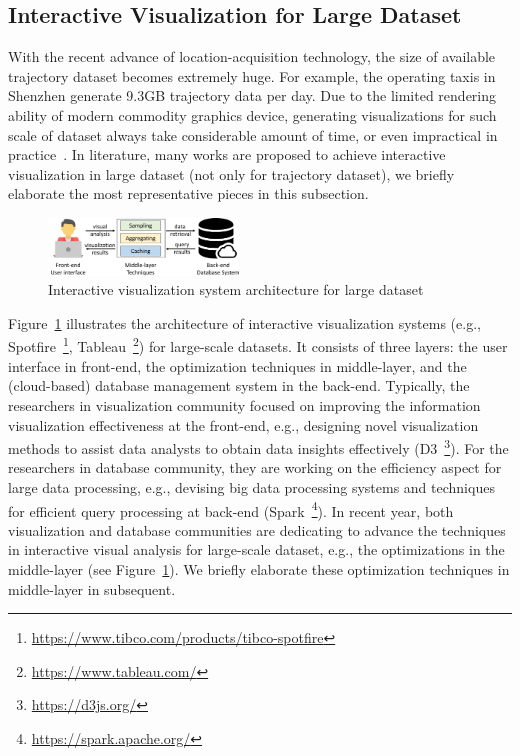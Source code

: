 \subsection{Interactive Visualization for Large Dataset}\label{sec:interactive}

With the recent advance of location-acquisition technology, the size of available trajectory dataset becomes extremely huge.
For example, the operating taxis in Shenzhen generate 9.3GB trajectory data per day.
Due to the limited rendering ability of modern commodity graphics device, generating visualizations for such scale of dataset always take considerable amount of time,
or even impractical in practice~\cite{park2016visualization}.
In literature, many works are proposed to achieve interactive visualization in large dataset (not only for trajectory dataset), we briefly elaborate the most representative pieces in this subsection.

\begin{figure}
	\centering
	\includegraphics[width=0.45\textwidth]{pictures/framework/framework.pdf}
	\caption{Interactive visualization system architecture for large dataset}
	\label{fig:framework}
\end{figure}

Figure~\ref{fig:framework} illustrates the architecture of interactive visualization systems (e.g., Spotfire~\footnote{\url{https://www.tibco.com/products/tibco-spotfire}}, Tableau~\footnote{\url{https://www.tableau.com/}}) for large-scale datasets.
It consists of three layers: the user interface in front-end, the optimization techniques in middle-layer, and the (cloud-based) database management system in the back-end.
Typically, the researchers in visualization community focused on improving the information visualization effectiveness at the front-end,
e.g., designing novel visualization methods to assist data analysts to obtain data insights effectively (D3~\footnote{\url{https://d3js.org/}}).
For the researchers in database community, they are working on the efficiency aspect for large data processing,
e.g., devising big data processing systems and techniques for efficient query processing at back-end (Spark~\footnote{\url{https://spark.apache.org/}}).
In recent year, both visualization and database communities are dedicating to advance the techniques in interactive visual analysis for large-scale dataset,
e.g., the optimizations in the middle-layer (see Figure~\ref{fig:framework}).
We briefly elaborate these optimization techniques in middle-layer in subsequent. %

